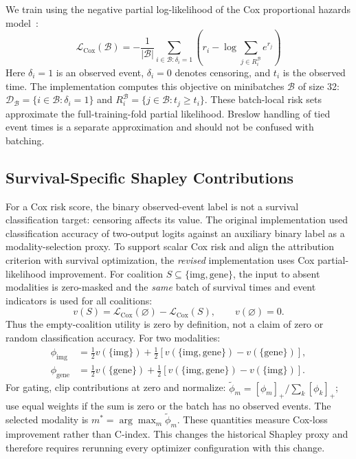 \documentclass[runningheads]{llncs}
\begin{document}
We train using the negative partial log-likelihood of the Cox
proportional hazards model~\cite{cox1972}:
\begin{equation}
\mathcal{L}_{\text{Cox}}(\mathcal{B}) =
-\frac{1}{|\mathcal{B}|}
\sum_{i\in\mathcal{B}:\delta_i=1}
\left( r_i-\log\sum_{j\in R_i^\mathcal{B}} e^{r_j}\right)
\label{eq:cox}
\end{equation}
Here $\delta_i=1$ is an observed event, $\delta_i=0$ denotes
censoring, and $t_i$ is the observed time. The implementation
computes this objective on minibatches $\mathcal{B}$ of size 32:
$\mathcal{D}_{\mathcal{B}}=\{i\in\mathcal{B}:\delta_i=1\}$
and $R_i^{\mathcal{B}}=\{j\in\mathcal{B}:t_j\geq t_i\}$.
These batch-local risk sets approximate the full-training-fold
partial likelihood. Breslow handling of tied event times is a
separate approximation and should not be confused with batching.

\subsection{Survival-Specific Shapley Contributions}
For a Cox risk score, the binary observed-event label is not a
survival classification target: censoring affects its value.
The original implementation used classification accuracy of
two-output logits against an auxiliary binary label as a
modality-selection proxy. To support scalar Cox risk and align
the attribution criterion with survival optimization, the
\emph{revised} implementation uses Cox partial-likelihood improvement.
For coalition $S\subseteq\{\mathrm{img},\mathrm{gene}\}$, the input
to absent modalities is zero-masked and the \emph{same} batch
of survival times and event indicators is used for all coalitions:
\begin{equation}
v(S)=\mathcal{L}_{\mathrm{Cox}}(\varnothing)
     -\mathcal{L}_{\mathrm{Cox}}(S),\qquad v(\varnothing)=0.
\label{eq:coalition}
\end{equation}
Thus the empty-coalition utility is zero by definition, not a
claim of zero or random classification accuracy. For two modalities:
\begin{align}
\phi_{\mathrm{img}}&=\tfrac12 v(\{\mathrm{img}\})
+\tfrac12[v(\{\mathrm{img},\mathrm{gene}\})-v(\{\mathrm{gene}\})],\\
\phi_{\mathrm{gene}}&=\tfrac12 v(\{\mathrm{gene}\})
+\tfrac12[v(\{\mathrm{img},\mathrm{gene}\})-v(\{\mathrm{img}\})].
\label{eq:shapley}
\end{align}
For gating, clip contributions at zero and normalize:
$\tilde\phi_m=[\phi_m]_+/\sum_k[\phi_k]_+$; use equal weights
if the sum is zero or the batch has no observed events.
The selected modality is $m^*=\arg\max_m\tilde\phi_m$.
These quantities measure Cox-loss improvement rather than
C-index. This changes the historical Shapley proxy and therefore
requires rerunning every optimizer configuration with this change.
\end{document}
